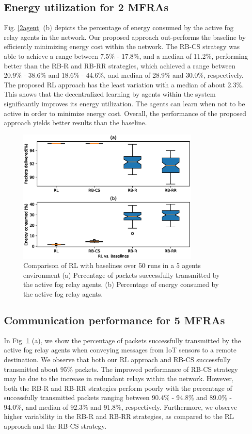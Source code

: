 \documentclass[journal]{IEEEtran}
\begin{document}
\subsection{Energy utilization for 2 MFRAs}
Fig. \ref{2agent} (b) depicts the percentage of energy consumed by the active fog relay agents in the network. Our proposed approach out-performs the baseline by efficiently minimizing energy cost within the network. The RB-CS strategy was able to achieve a range between 7.5\% - 17.8\%, and a median of 11.2\%, performing better than the RB-R and RB-RR strategies, which achieved a range between 20.9\% - 38.6\% and 18.6\% - 44.6\%, and median of 28.9\% and 30.0\%, respectively. The proposed RL approach has the least variation with a median of about 2.3\%. This shows that the decentralized learning by agents within the system significantly improves its energy utilization. The agents can learn when not to be active in order to minimize energy cost. Overall, the performance of the proposed approach yields better results than the baseline.

\begin{figure}[!t]
\centering
\includegraphics[width=3.6in]{5agentbaseline.eps}
\caption{Comparison of RL with baselines over 50 runs in a 5 agents environment (a) Percentage of packets successfully transmitted by the active fog relay agents,  (b) Percentage of energy consumed by the active fog relay agents.}
\label{5agent}
\end{figure}

\subsection{Communication performance for 5 MFRAs}
In Fig. \ref{5agent} (a), we show the percentage of packets successfully transmitted by the active fog relay agents when conveying messages from IoT sensors to a remote destination. We observe that both our RL approach and RB-CS successfully transmitted about 95\% packets. The improved performance of RB-CS strategy may be due to the increase in redundant relays within the network. However, both the RB-R and RB-RR strategies perform poorly with the percentage of successfully transmitted packets ranging between 90.4\% - 94.8\% and 89.0\% - 94.0\%, and median of 92.3\% and 91.8\%, respectively. Furthermore, we observe higher variability in the RB-R and RB-RR strategies, as compared to the RL approach and the RB-CS strategy.
\end{document}
